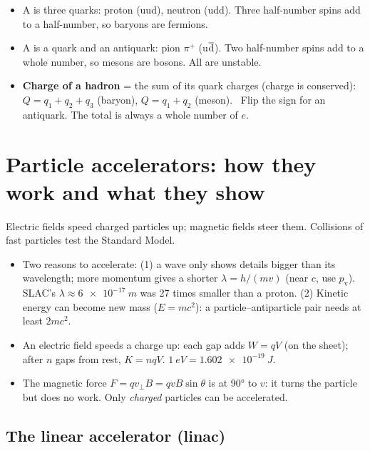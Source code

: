 \begin{itemize}
  \item A  is three quarks: proton (uud), neutron (udd). Three half-number
        spins add to a half-number, so baryons are fermions.
  \item A  is a quark and an antiquark: pion $\pi^+$ (u$\overline{\mathrm{d}}$). Two
        half-number spins add to a whole number, so mesons are bosons. All are unstable.
  \item \textbf{Charge of a hadron} = the sum of its quark charges (charge is conserved):
        $Q = q_1 + q_2 + q_3$ (baryon), $Q = q_1 + q_2$ (meson). \hscbadgenotonsheet\
        Flip the sign for an antiquark. The total is always a whole number of $e$.
\end{itemize}

\section{Particle accelerators: how they work and what they show}\label{ch5:sec:accel}
\covers{M8.IQ5.03}

\begin{bigidea}
Electric fields speed charged particles up; magnetic fields steer them. Collisions of
fast particles test the Standard Model.
\end{bigidea}

\begin{itemize}
  \item Two reasons to accelerate: (1) a wave only shows details bigger than its wavelength; more
        momentum gives a shorter $\lambda = h/(mv)$ (near $c$, use $p_\mathrm{v}$). SLAC's
        $\lambda \approx \qty{6e-17}{m}$ was 27 times smaller than a proton. (2) Kinetic
        energy can become new mass ($E = mc^2$): a particle--antiparticle pair needs at
        least $2mc^2$.
  \item An electric field speeds a charge up: each gap adds $W = qV$ (on the sheet); after
        $n$ gaps from rest, $K = nqV$. $\qty{1}{eV} = \qty{1.602e-19}{J}$.
  \item The magnetic force $F = qv_\perp B = qvB\sin\theta$ is at \ang{90} to $v$: it turns
        the particle but does no work. Only \emph{charged} particles can be accelerated.
\end{itemize}

\subsection{The linear accelerator (linac)}

